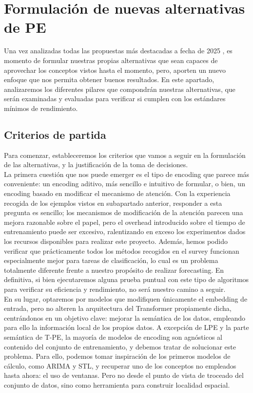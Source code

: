 \section{Formulación de nuevas alternativas de PE}

Una vez analizadas todas las propuestas más destacadas a fecha de 2025 \cite{irani2025positionalencodingtransformerbasedtime}, es momento de formular nuestras propias alternativas que sean capaces de aprovechar los conceptos vistos hasta el momento, pero, aporten un nuevo enfoque que nos permita obtener buenos resultados. En este apartado, analizaremos los diferentes pilares que compondrán nuestras alternativas, que serán examinadas y evaluadas para verificar si cumplen con los estándares mínimos de rendimiento.

\subsection{Criterios de partida}

Para comenzar, estableceremos los criterios que vamos a seguir en la formulación de las alternativas, y la justificación de la toma de decisiones.\\

La primera cuestión que nos puede emerger es el tipo de encoding que parece más conveniente: un encoding aditivo, más sencillo e intuitivo de formular, o bien, un encoding basado en modificar el mecanismo de atención. Con la experiencia recogida de los ejemplos vistos en subapartado anterior, responder a esta pregunta es sencillo; los mecanismos de modificación de la atención parecen una mejora razonable sobre el papel, pero el overhead introducido sobre el tiempo de entrenamiento puede ser excesivo, ralentizando en exceso los experimentos dados los recursos disponibles para realizar este proyecto. Además, hemos podido verificar que prácticamente todos los métodos recogidos en el survey funcionan especialmente mejor para tareas de clasificación, lo cual es un problema totalmente diferente frente a nuestro propósito de realizar forecasting. En definitiva, si bien ejecutaremos alguna prueba puntual con este tipo de algoritmos para verificar su eficiencia y rendimiento, no será nuestro camino a seguir.\\

En su lugar, optaremos por modelos que modifiquen únicamente el embedding de entrada, pero no alteren la arquitectura del Transformer propiamente dicha, centrándonos en un objetivo clave: mejorar la semántica de los datos, empleando para ello la información local de los propios datos. A excepción de LPE y la parte semántica de T-PE, la mayoría de modelos de encoding son agnósticos al contenido del conjunto de entrenamiento, y debemos tratar de solucionar este problema. Para ello, podemos tomar inspiración de los primeros modelos de cálculo, como ARIMA y STL, y recuperar uno de los conceptos no empleados hasta ahora: el uso de ventanas. Pero no desde el punto de vista de troceado del conjunto de datos, sino como herramienta para construir localidad espacial.\\

